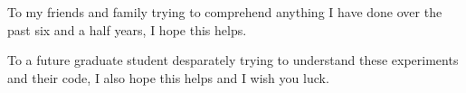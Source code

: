 To my friends and family trying to comprehend anything I have done over the past six and a half years, I hope this helps.

To a future graduate student desparately trying to understand these experiments and their code, I also hope this helps and I wish you luck.
